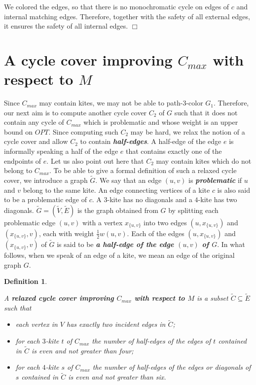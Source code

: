\documentclass[a4, 11pt]{article}
\newcommand{\koniec}{\hfill $\Box$\\[.1ex]}
\newcommand{\<}{\langle}
\renewcommand{\>}{\rangle}
\newtheorem{definition}{Definition}
\begin{document}
We colored the edges, so that there is no monochromatic cycle on edges of $c$ and internal matching edges. Therefore, together with the safety of all external edges, it ensures the safety of all internal edges. \koniec





\section{A cycle cover improving $C_{max}$ with respect to $M$}

Since $C_{max}$ may contain kites, we may not be able to path-$3$-color $G_1$. Therefore, our next aim is to compute another cycle cover  $C_2$ of $G$ such that it does not contain any cycle of $C_{max}$ which is problematic and whose weight is an upper bound on $OPT$. Since computing such $C_2$ may be hard, we relax the notion of a cycle cover and allow $C_2$ to contain {\bf \em half-edges}. A half-edge of the edge $e$ is informally speaking
a half of the edge $e$ that contains exactly one of the endpoints of $e$. Let us also point out  here that $C_2$ may contain kites which do not belong to $C_{max}$.
To be able to  give a formal definition of such a relaxed cycle cover, we introduce a graph $\tilde G$. We say that an edge $(u,v)$  is {\bf \em problematic} if $u$ and $v$ belong to the same kite. An edge connecting vertices of a kite $c$  is also said to be a problematic edge of $c$. A $3$-kite has no diagonals  and a $4$-kite has two diagonals.   $\tilde G=(\tilde V, \tilde E)$ is the graph obtained from $G$ by splitting each problematic  edge $(u,v)$ with a vertex $x_{\{u,v\}}$ into two edges 
$(u,  x_{\{u,v\}})$ and $(x_{\{u,v\}}, v)$, each with weight $\frac 12w(u,v)$.  Each of the edges $(u,  x_{\{u,v\}})$ and $(x_{\{u,v\}}, v)$ of $\tilde G$ is said to be {\bf \em a half-edge of the edge $(u,v)$ of $G$}.  In what follows, when we speak of an edge of a kite, we mean an edge of the original graph $G$.

\begin{definition}\label{relst}

A {\bf \em relaxed cycle cover   improving $C_{max}$ with respect to $M$}  is a subset $\tilde C\subseteq \tilde E$ such that
\begin{itemize}
\item[(i)]
each vertex in $V$ has exactly two incident edges  in $\tilde C$;

\item[(ii)]
for each $3$-kite  $t$ of $C_{max}$  the number of  half-edges  of  the edges of $t$ contained in  $\tilde C$  is even  and   not greater than four;
\item[(iii)]
for each $4$-kite  $s$ of $C_{max}$ the number of half-edges  of  the edges  or diagonals of $s$  contained in $\tilde C$ is even  and not greater than six.
\end{itemize}
\end{definition}
\end{document}
